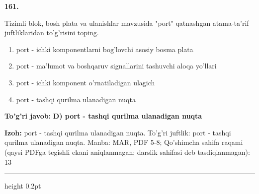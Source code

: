 \documentclass[10pt,a4paper]{article}
\begin{document}
{\bfseries\sffamily\color{ink} 161.}
\par
Tizimli blok, bosh plata va ulanishlar mavzusida "port" qatnashgan atama-ta'rif juftliklaridan to'g'risini toping.
\begin{enumerate}[label=\Alph*),leftmargin=9mm]
\item port - ichki komponentlarni bog'lovchi asosiy bosma plata
\item port - ma'lumot va boshqaruv signallarini tashuvchi aloqa yo'llari
\item port - ichki komponent o'rnatiladigan ulagich
\item port - tashqi qurilma ulanadigan nuqta
\end{enumerate}
\begin{tcolorbox}[enhanced,breakable,colback=teal!4,colframe=teal!60!black,boxrule=0.45pt,arc=1.2mm,left=2.7mm,right=2.7mm,top=1.8mm,bottom=1.8mm,before skip=2mm,after skip=2mm]
{\bfseries\sffamily\color{teal}To'g'ri javob:} \textbf{D) port - tashqi qurilma ulanadigan nuqta}
\par\smallskip
{\bfseries Izoh:} port - tashqi qurilma ulanadigan nuqta. To'g'ri juftlik: port - tashqi qurilma ulanadigan nuqta. Manba: MAR, PDF 5-8; Qo'shimcha sahifa raqami (qaysi PDFga tegishli ekani aniqlanmagan; darslik sahifasi deb tasdiqlanmagan): 13
\end{tcolorbox}
\vspace{2mm}\hrule height 0.2pt\vspace{3mm}
\end{document}
